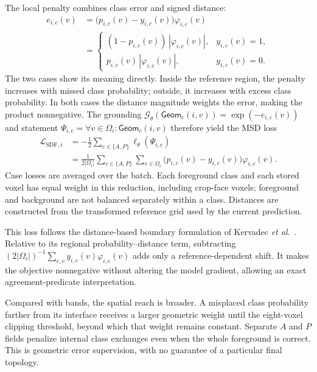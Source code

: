 \documentclass[12pt,a4paper]{article}
\begin{document}
The local penalty combines class error and signed distance:
\begin{equation}
\begin{aligned}
e_{i,c}(v)
&=\bigl(p_{i,c}(v)-y_{i,c}(v)\bigr)\varphi_{i,c}(v)\\
&=\begin{cases}
   (1-p_{i,c}(v))\,|\varphi_{i,c}(v)|, &y_{i,c}(v)=1,\\
   p_{i,c}(v)\,|\varphi_{i,c}(v)|, &y_{i,c}(v)=0.
  \end{cases}
\end{aligned}
\label{eq:sdf-local-violation}
\end{equation}
The two cases show its meaning directly. Inside the reference region,
the penalty increases with missed class probability; outside, it
increases with excess class probability. In both cases the distance
magnitude weights the error, making the product nonnegative.
The grounding
$\mathcal G_\theta(\mathsf{Geom}_c(i,v))=\exp(-e_{i,c}(v))$
and statement
$\Psi_{i,c}=\forall v\in\Omega_i:\mathsf{Geom}_c(i,v)$
therefore yield the MSD loss
\begin{equation}
\begin{aligned}
\mathcal{L}_{\mathrm{SDF},i}
&=-\frac12\sum_{c\in\{A,P\}}\ell_\theta(\Psi_{i,c})\\
&=\frac{1}{2|\Omega_i|}
  \sum_{c\in\{A,P\}}\sum_{v\in\Omega_i}
  \bigl(p_{i,c}(v)-y_{i,c}(v)\bigr)\varphi_{i,c}(v).
\end{aligned}
\label{eq:sdf-full-volume-loss}
\end{equation}
Case losses are averaged over the batch. Each foreground class and each
stored voxel has equal weight in this reduction, including crop-face
voxels; foreground and background are not balanced separately within
a class. Distances are constructed from the transformed reference grid
used by the current prediction.

This loss follows the distance-based boundary formulation of
Kervadec \emph{et al.}\ \cite{kervadec2019boundary}. Relative to its regional
probability--distance term, subtracting
$(2|\Omega_i|)^{-1}\sum_{c,v}y_{i,c}(v)\varphi_{i,c}(v)$
adds only a reference-dependent shift. It makes the objective
nonnegative without altering the model gradient, allowing an exact
agreement-predicate interpretation.

Compared with bands, the spatial reach is broader. A misplaced class
probability farther from its interface receives a larger geometric
weight until the eight-voxel clipping threshold, beyond which that
weight remains constant. Separate $A$ and $P$ fields penalize internal
class exchanges even when the whole foreground is correct. This is
geometric error supervision, with no guarantee of a particular final
topology.
\end{document}
